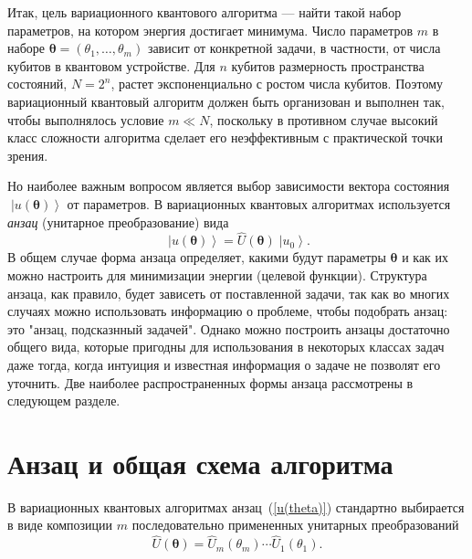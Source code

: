 \documentclass[a4paper]{report}
\newcommand{\ket}[1] {\!\!\;\ensuremath{\left|#1\right\rangle}}
\begin{document}
Итак, цель вариационного квантового алгоритма --- найти такой набор параметров, на котором энергия достигает минимума. Число параметров $m$ в наборе $\bm\theta=(\theta_1, \ldots,\theta_m)$ зависит от конкретной задачи, в частности, от числа кубитов в квантовом устройстве. Для $n$ кубитов размерность пространства состояний, $N=2^n$, растет экспоненциально с ростом числа кубитов. Поэтому вариационный квантовый алгоритм должен быть организован и выполнен так, чтобы выполнялось условие $m\ll N$, поскольку в противном случае высокий класс сложности алгоритма сделает его неэффективным с практической точки зрения.

Но наиболее важным вопросом является выбор зависимости вектора состояния $\ket{u(\bm\theta)}$ от параметров. В вариационных квантовых алгоритмах используется \textit{анзац} (унитарное преобразование) вида
\begin{equation}\label{u(theta)}
\ket{u(\bm\theta)}= \hat{U}(\bm\theta)\ket{u_0}.
\end{equation}
В общем случае форма анзаца определяет, какими будут параметры $\boldsymbol\theta$ и как их можно настроить для минимизации энергии (целевой функции). Структура анзаца, как правило, будет зависеть от поставленной задачи, так как во многих случаях можно использовать информацию о проблеме, чтобы подобрать анзац: это "анзац, подсказнный задачей". Однако можно построить анзацы достаточно общего вида, которые пригодны для использования в некоторых классах задач даже тогда, когда интуиция и известная информация о задаче не позволят его уточнить. Две наиболее распространенных формы анзаца рассмотрены в следующем разделе.





\section{Анзац и общая схема алгоритма}

В вариационных квантовых алгоритмах анзац~(\ref{u(theta)}) стандартно выбирается в виде композиции $m$ последовательно примененных унитарных преобразований
\begin{equation}\label{Ansatz}
\hat{U}(\boldsymbol\theta)= \hat{U}_{m}(\theta_m)\cdots \hat{U}_{1}(\theta_1).
\end{equation}
\end{document}
